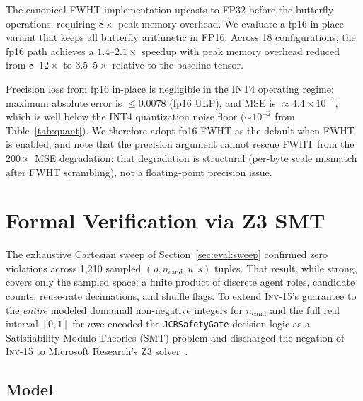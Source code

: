 \documentclass[10pt,twocolumn]{article}
\newcommand{\INV}[1]{\textsc{Inv-#1}}
\newcommand{\Cand}{n_{\text{cand}}}
\newcommand{\Reuse}{u}
\newcommand{\Shuf}{s}
\newcommand{\code}[1]{\texttt{\small #1}}
\begin{document}
The canonical FWHT implementation upcasts to FP32 before the butterfly
operations, requiring $8\times$ peak memory overhead. We evaluate a
fp16-in-place variant that keeps all butterfly arithmetic in FP16. Across
18 configurations, the fp16 path achieves a $1.4$--$2.1\times$ speedup
with peak memory overhead reduced from $8$--$12\times$ to
$3.5$--$5\times$ relative to the baseline tensor.

Precision loss from fp16 in-place is negligible in the INT4 operating
regime: maximum absolute error is $\leq 0.0078$ (fp16 ULP), and MSE is
$\approx 4.4 \times 10^{-7}$, which is well below the INT4 quantization
noise floor ($\sim 10^{-2}$ from Table~\ref{tab:quant}). We therefore
adopt fp16 FWHT as the default when FWHT is enabled, and note that the
precision argument cannot rescue FWHT from the $200\times$ MSE
degradation: that degradation is structural (per-byte scale mismatch after
FWHT scrambling), not a floating-point precision issue.

\section{Formal Verification via Z3 SMT}
\label{sec:z3-proof}

The exhaustive Cartesian sweep of Section~\ref{sec:eval:sweep}
confirmed zero violations across 1{,}210 sampled
$(\rho, \Cand, \Reuse, \Shuf)$ tuples. That result, while strong,
covers only the sampled space: a finite product of discrete agent
roles, candidate counts, reuse-rate decimations, and shuffle flags.
To extend \INV{15}'s guarantee to the \emph{entire} modeled
domain\textemdash all non-negative integers for $\Cand$ and the full
real interval $[0, 1]$ for $\Reuse$\textemdash we encoded the
\code{JCRSafetyGate} decision logic as a Satisfiability Modulo
Theories (SMT) problem and discharged the negation of \INV{15} to
Microsoft Research's Z3 solver~\cite{demoura2008z3}.

\subsection{Model}
\label{ssec:z3-model}
\end{document}
